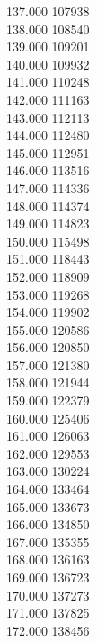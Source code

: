 { 137.000	107938 \\
 138.000	108540 \\
 139.000	109201 \\
 140.000	109932 \\
 141.000	110248 \\
 142.000	111163 \\
 143.000	112113 \\
 144.000	112480 \\
 145.000	112951 \\
 146.000	113516 \\
 147.000	114336 \\
 148.000	114374 \\
 149.000	114823 \\
 150.000	115498 \\
 151.000	118443 \\
 152.000	118909 \\
 153.000	119268 \\
 154.000	119902 \\
 155.000	120586 \\
 156.000	120850 \\
 157.000	121380 \\
 158.000	121944 \\
 159.000	122379 \\
 160.000	125406 \\
 161.000	126063 \\
 162.000	129553 \\
 163.000	130224 \\
 164.000	133464 \\
 165.000	133673 \\
 166.000	134850 \\
 167.000	135355 \\
 168.000	136163 \\
 169.000	136723 \\
 170.000	137273 \\
 171.000	137825 \\
 172.000	138456 \\
}
